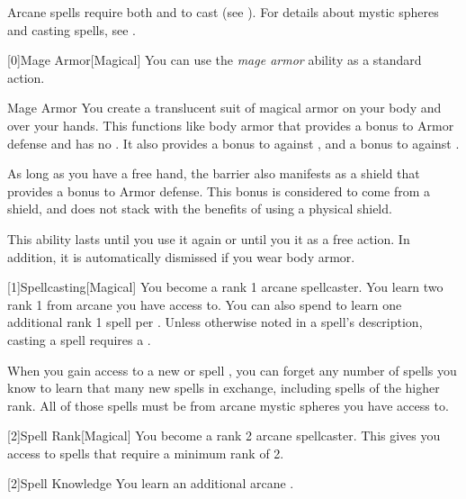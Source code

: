         Arcane spells require both  and  to cast (see ).
        For details about mystic spheres and casting spells, see .

        [0]{Mage Armor}[Magical] You can use the \textit{mage armor} ability as a standard action.
        \begin{freeability}{Mage Armor}
            You create a translucent suit of magical armor on your body and over your hands.
            This functions like body armor that provides a  bonus to Armor defense and has no .
            It also provides a  bonus to  against , and a  bonus to  against .

            As long as you have a free hand, the barrier also manifests as a shield that provides a  bonus to Armor defense.
            This bonus is considered to come from a shield, and does not stack with the benefits of using a physical shield.

            This ability lasts until you use it again or until you  it as a free action.
            In addition, it is automatically dismissed if you wear body armor.
        \end{freeability}

        [1]{Spellcasting}[Magical]
        You become a rank 1 arcane spellcaster.
        You learn two rank 1  from arcane  you have access to.
        You can also spend  to learn one additional rank 1 spell per .
        Unless otherwise noted in a spell's description, casting a spell requires a .

        When you gain access to a new  or spell ,
            you can forget any number of spells you know to learn that many new spells in exchange,
            including spells of the higher rank.
        All of those spells must be from arcane mystic spheres you have access to.

        [2]{Spell Rank}[Magical] You become a rank 2 arcane spellcaster.
        This gives you access to spells that require a minimum rank of 2.

        [2]{Spell Knowledge} You learn an additional arcane .

